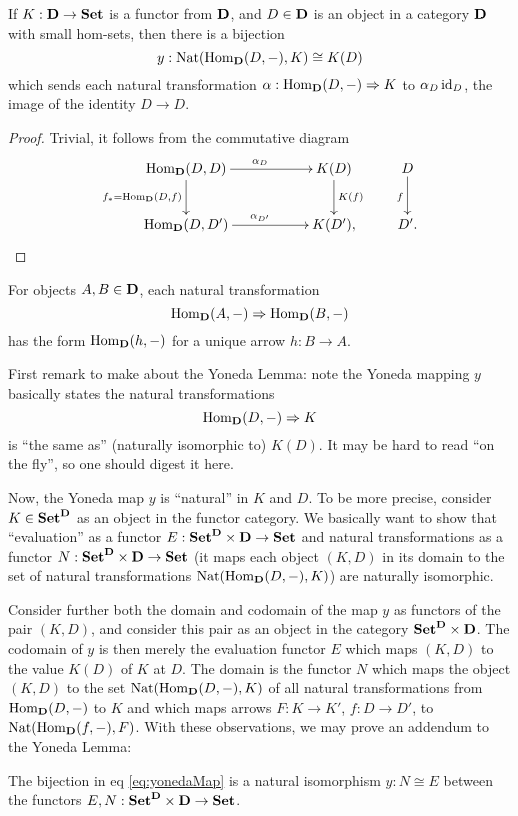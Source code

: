 \begin{framed}
\begin{yoneda}
If $K:\mathbf{D}\to\mathbf{Set}$ is a functor from $\mathbf{D}$, and
$D\in\mathbf{D}$ is an object in a category $\mathbf{D}$ with small
hom-sets, then there is a bijection
\begin{equation}\label{eq:yonedaMap}
y:\operatorname{Nat}(\operatorname{Hom}_{\mathbf{D}}(D,-),K)\cong{}K(D)
\end{equation}
which sends each natural transformation
$\alpha:\operatorname{Hom}_{\mathbf{D}}(D,-)\Rightarrow{}K$ to $\alpha_{D}\operatorname{id}_{D}$,
the image of the identity $D\to D$.
\end{yoneda}
\end{framed}
\begin{proof}
Trivial, it follows from the commutative diagram
\begin{equation}%
\vcenter{\xymatrix{
\hom_{\ms{D}}(D,D)\ar[rr]^{\alpha_{D}}\ar[d]_{f_{*}=\hom_{\ms{D}}(D,f)}
&& K(D)\ar[d]^{K(f)}  & D\ar[d]_{f}\\
\hom_{\ms{D}}(D,D')\ar[rr]^{\alpha_{D'}}
&& K(D'), & D'.
}}
\end{equation}
\end{proof}

\begin{cor}%
For objects $A,B\in\mathbf{D}$, each natural transformation
$$\operatorname{Hom}_{\mathbf{D}}(A,-)\Rightarrow{\operatorname{Hom}_{\mathbf{D}}(B,-)}$$ has the form
$\operatorname{Hom}_{\mathbf{D}}(h,-)$ for a unique arrow $h:B\to{A}$.
\end{cor}

First remark to make about the Yoneda Lemma: note the Yoneda
mapping $y$ basically states the natural
transformations $$\operatorname{Hom}_{\mathbf{D}}(D,-)\Rightarrow{}K$$ is ``the same as'' 
(naturally isomorphic to) $K(D)$. It may be hard to read ``on the
fly'', so one should digest it here.

Now, the Yoneda map $y$ is ``natural'' in $K$ and $D$. To be more
precise, consider $K\in\mathbf{Set}^{\mathbf{D}}$ as an object in the
functor category. We basically want to show that ``evaluation''
as a functor $E:\mathbf{Set}^{\mathbf{D}}\times{\mathbf{D}}\to\mathbf{Set}$ and
natural transformations as a functor
$N:\mathbf{Set}^{\mathbf{D}}\times{\mathbf{D}}\to\mathbf{Set}$ (it maps each
object $(K,D)$ in its domain to the set of natural
transformations $\operatorname{Nat}(\operatorname{Hom}_{\mathbf{D}}(D,-),K)$) are naturally isomorphic.

Consider further both the domain and codomain of the map $y$ as
functors of the pair $(K,D)$, and consider this pair as an object
in the category $\mathbf{Set}^{\mathbf{D}}\times{\mathbf{D}}$. The codomain
of $y$ is then merely the evaluation functor $E$ which maps
$(K,D)$ to the value $K(D)$ of $K$ at $D$. The domain is the
functor $N$ which maps the object $(K,D)$ to the set
$\operatorname{Nat}(\operatorname{Hom}_{\mathbf{D}}(D,-),K)$ of all natural transformations from
$\operatorname{Hom}_{\mathbf{D}}(D,-)$ to $K$ and which maps arrows $F:K\to{K'}$,
$f:D\to{D'}$, to $\operatorname{Nat}(\operatorname{Hom}_{\mathbf{D}}(f,-),F)$. With these
observations, we may prove an addendum to the Yoneda Lemma:
\begin{lem}%
The bijection in eq \eqref{eq:yonedaMap} is a natural isomorphism
$y:N\cong{E}$ between the functors $E,N:\mathbf{Set}^{\mathbf{D}}\times{\mathbf{D}}\to\mathbf{Set}$.
\end{lem}
